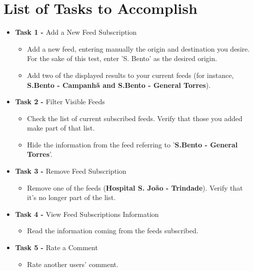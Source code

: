\section{List of Tasks to Accomplish}
\begin{itemize}

\item \textbf{Task 1 -} Add a New Feed Subscription

\begin{itemize}
\item Add a new feed, entering manually the origin and destination you desire. For the sake of this test, enter 'S. Bento' as the desired origin.
\item Add two of the displayed results to your current feeds (for instance, \textbf{S.Bento - Campanhã and S.Bento - General Torres}).
\end{itemize} 

\item \textbf{Task 2 -} Filter Visible Feeds

\begin{itemize}
\item Check the list of current subscribed feeds. Verify that those you added make part of that list.
\item Hide the information from the feed referring to '\textbf{S.Bento - General Torres}'.
\end{itemize} 

\item \textbf{Task 3 -} Remove Feed Subscription

\begin{itemize}
\item Remove one of the feeds (\textbf{Hospital S. João - Trindade}). Verify that it's no longer part of the list.
\end{itemize}

\item \textbf{Task 4 -} View Feed Subscriptions Information

\begin{itemize}
\item Read the information coming from the feeds subscribed.
\end{itemize}

\item \textbf{Task 5 -} Rate a Comment

\begin{itemize}
\item Rate another users' comment.
\end{itemize}


\end{itemize}

